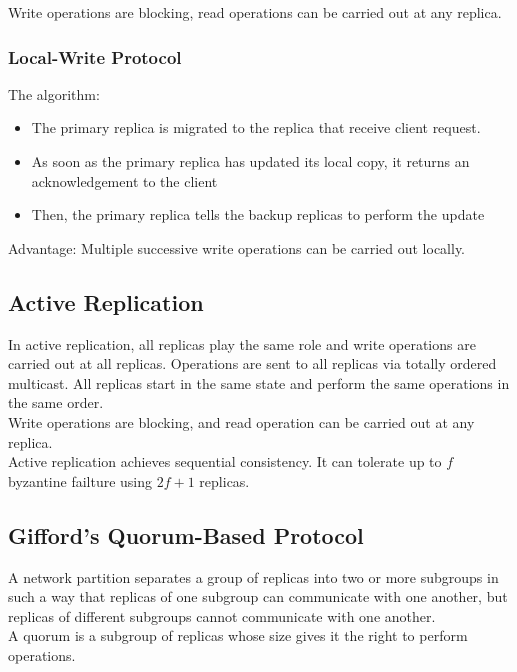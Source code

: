 \begin{multicols*}{2}
\noindent Write operations are blocking, read operations can be carried out at any replica.

\subsubsection{Local-Write Protocol}

\noindent The algorithm:
\begin{itemize}
  \item The primary replica is migrated to the replica that receive client request.
  \item As soon as the primary replica has updated its local copy, it returns an acknowledgement to the client
  \item Then, the primary replica tells the backup replicas to perform the update
\end{itemize}

\noindent Advantage: Multiple successive write operations can be carried out locally.

\subsection{Active Replication}

\noindent In active replication, all replicas play the same role and write operations are carried out at all replicas. Operations are sent to all replicas via totally ordered multicast. All replicas start in the same state and perform the same operations in the same order. \\

\noindent Write operations are blocking, and read operation can be carried out at any replica. \\

\noindent Active replication achieves sequential consistency. It can tolerate up to $f$ byzantine failture using $2f+1$ replicas.

\subsection{Gifford’s Quorum-Based Protocol}

\noindent A network partition separates a group of replicas into two or more subgroups in such a way that replicas of one subgroup can communicate with one another, but replicas of different subgroups cannot communicate with one another. \\

\noindent A quorum is a subgroup of replicas whose size gives it the right to perform operations.\\


\end{multicols*}
